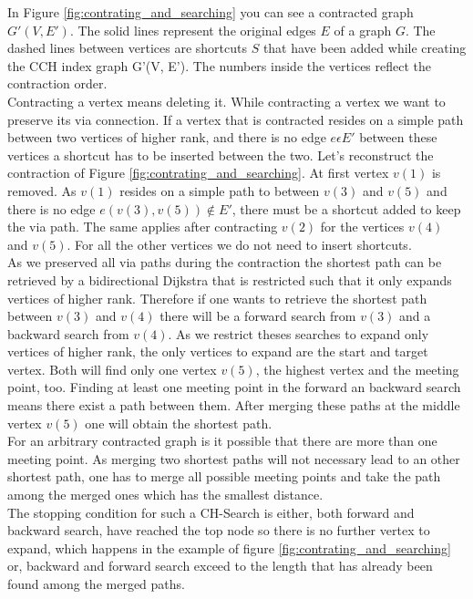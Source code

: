 In Figure \ref{fig:contrating_and_searching} you can see a contracted graph $G'(V,E')$. The solid lines represent the original edges $E$ of a graph $G$. The dashed lines between vertices are shortcuts $S$ that 
have been added while creating the CCH index graph G'(V, E'). The numbers inside the vertices reflect the contraction order.
\\
Contracting a vertex means deleting it. While contracting a vertex we want to preserve its via connection. If a vertex that is contracted resides on a simple path between two vertices of higher rank,
and there is no edge $e \epsilon E'$ between these vertices a shortcut has to be inserted between the two. 
Let's reconstruct the contraction of Figure \ref{fig:contrating_and_searching}. At first vertex $v(1)$ is removed. As $v(1)$ resides on a simple path to between $v(3)$ and $v(5)$ and there is no edge $e(v(3), v(5)) \notin E'$,
there must be a shortcut added to keep the via path.
The same applies after contracting $v(2)$ for the vertices $v(4)$ and $v(5)$. For all the other vertices we do not need to insert shortcuts.
\\
As we preserved all via paths during the contraction the shortest path can be retrieved by a bidirectional Dijkstra that is restricted such that it only expands vertices of higher rank. 
Therefore if one wants to retrieve the shortest path between $v(3)$ and $v(4)$ there will be a forward search from $v(3)$ and a backward search from $v(4)$. As we restrict theses searches to expand only vertices
of higher rank, the only vertices to expand are the start and target vertex. Both will find only one vertex $v(5)$, the highest vertex and the meeting point, too. Finding at least one meeting point in the forward an backward search means there exist a path between them.
After merging these paths at the middle vertex $v(5)$ one will obtain the shortest path.
\\
For an arbitrary contracted graph is it possible that there are more than one meeting point. As merging two shortest paths will not necessary lead to an other shortest path, one has to merge
all possible meeting points and take the path among the merged ones which has the smallest distance. 
\\ 
The stopping condition for such a CH-Search is either, both forward and backward search, have reached the top node so there is no further vertex to expand, which happens in the example of figure \ref{fig:contrating_and_searching} or, backward and forward search exceed to 
the length that has already been found among the merged paths.

